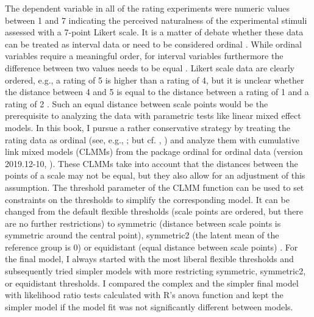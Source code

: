 The dependent variable in all of the rating experiments were numeric values between 1 and 7 indicating the perceived naturalness of the experimental stimuli assessed with a 7-point Likert scale.
It is a matter of debate whether these data can be treated as interval data or need to be considered ordinal \citep{carifio.perla2008}.
While ordinal variables require a meaningful order, for interval variables furthermore the difference between two values needs to be equal \citep[26]{rasinger2013}.
Likert scale data are clearly ordered, e.g., a rating of 5 is higher than a rating of 4, but it is unclear whether the distance between 4 and 5 is equal to the distance between a rating of 1 and a rating of 2 \citep[33--34]{schutze.sprouse2014}.
Such an equal distance between scale points would be the prerequisite to analyzing the data with parametric tests like linear mixed effect models.
In this book, I pursue a rather conservative strategy by treating the rating data as ordinal (see, e.g., \cite{jamieson2004}; but cf. \cite{jaccard.wan1996}, \cite{carifio.perla2008}) and analyze them with cumulative link mixed models (CLMMs) from the package ordinal for ordinal data (version 2019.12-10, \cite{christensen2019}).
These CLMMs take into account that the distances between the points of a scale may not be equal, but they also allow for an adjustment of this assumption.
The threshold parameter of the CLMM function can be used to set constraints on the thresholds to simplify the corresponding model.
It can be changed from the default flexible thresholds (scale points are ordered, but there are no further restrictions) to symmetric (distance between scale points is symmetric around the central point), symmetric2 (the latent mean of the reference group is 0) or equidistant (equal distance between scale points) \citep{christensen2019}.
For the final model, I always started with the most liberal flexible thresholds and subsequently tried simpler models with more restricting symmetric, symmetric2, or equidistant thresholds.
I compared the complex and the simpler final model with likelihood ratio tests calculated with R's anova function \citep{rcoreteam2021} and kept the simpler model if the model fit was not significantly different between models.

